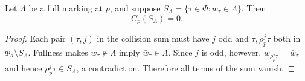 \begin{lemma}
\label{lem:a-full-mark-collision}
\emitthmsource
Let $\Lambda$ be a full marking at $p$, and suppose $S_\Lambda=\{\tau\in\Phi:w_\tau\in\Lambda\}$. Then
\[
 C_p(S_\Lambda)=0.
\]
\end{lemma}
\begin{proof}
Each pair $(\tau,j)$ in the collision sum must have $j$ odd and $\tau,\rho_p^j\tau$ both in $\Phi_a\setminus S_\Lambda$. Fullness makes $w_\tau\notin\Lambda$ imply $\bar w_\tau\in\Lambda$. Since $j$ is odd, however, $w_{\rho_p^j\tau}=\bar w_\tau$ and hence $\rho_p^j\tau\in S_\Lambda$, a contradiction. Therefore all terms of the sum vanish.
\end{proof}

